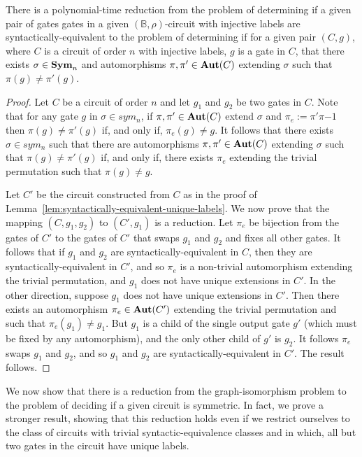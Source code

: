 \documentclass[../paper.tex]{subfiles}
\begin{document}
\begin{lem}
  There is a polynomial-time reduction from the problem of determining if a
  given pair of gates gates in a given $(\mathbb{B}, \rho)$-circuit with
  injective labels are syntactically-equivalent to the problem of determining if
  for a given pair $(C, g)$, where $C$ is a circuit of order $n$ with injective
  labels, $g$ is a gate in $C$, that there exists $\sigma \in \text{\textbf{Sym}}_n$ and
  automorphisms $\pi, \pi' \in \text{\textbf{Aut}}(C)$ extending $\sigma$ such that $\pi (g)
  \neq \pi' (g)$.
  \label{lem:syntactically-equivilent-unique-extensions}
\end{lem}
\begin{proof}
  Let $C$ be a circuit of order $n$ and let $g_1$ and $g_2$ be two gates in $C$.
  Note that for any gate $g$ in $\sigma \in sym_n$, if $\pi, \pi' \in \text{\textbf{Aut}}(C)$
  extend $\sigma$ and $\pi_e := \pi'\pi{-1}$ then $\pi(g) \neq \pi'(g)$ if, and
  only if, $\pi_e (g) \neq g$. It follows that there exists $\sigma \in sym_n$
  such that there are automorphisms $\pi, \pi' \in \text{\textbf{Aut}}(C)$ extending $\sigma$
  such that $\pi (g) \neq \pi'(g)$ if, and only if, there exists $\pi_e$
  extending the trivial permutation such that $\pi (g) \neq g$.

  Let $C'$ be the circuit constructed from $C$ as in the proof of
  Lemma~\ref{lem:syntactically-equivalent-unique-labels}. We now prove that the
  mapping $(C, g_1, g_2)$ to $(C', g_1)$ is a reduction. Let $\pi_e$ be
  bijection from the gates of $C'$ to the gates of $C'$ that swaps $g_1$ and
  $g_2$ and fixes all other gates. It follows that if $g_1$ and $g_2$ are
  syntactically-equivalent in $C$, then they are syntactically-equivalent in
  $C'$, and so $\pi_e$ is a non-trivial automorphism extending the trivial
  permutation, and $g_1$ does not have unique extensions in $C'$. In the other
  direction, suppose $g_1$ does not have unique extensions in $C'$. Then there
  exists an automorphism $\pi_e \in \text{\textbf{Aut}}(C')$ extending the trivial permutation
  and such that $\pi_e(g_1) \neq g_1$. But $g_1$ is a child of the single output
  gate $g'$ (which must be fixed by any automorphism), and the only other child
  of $g'$ is $g_2$. It follows $\pi_e$ swaps $g_1$ and $g_2$, and so $g_1$ and
  $g_2$ are syntactically-equivalent in $C'$. The result follows.
\end{proof}

We now show that there is a reduction from the graph-isomorphism problem to the
problem of deciding if a given circuit is symmetric. In fact, we prove a
stronger result, showing that this reduction holds even if we restrict ourselves
to the class of circuits with trivial syntactic-equivalence classes and in
which, all but two gates in the circuit have unique labels.
\end{document}
